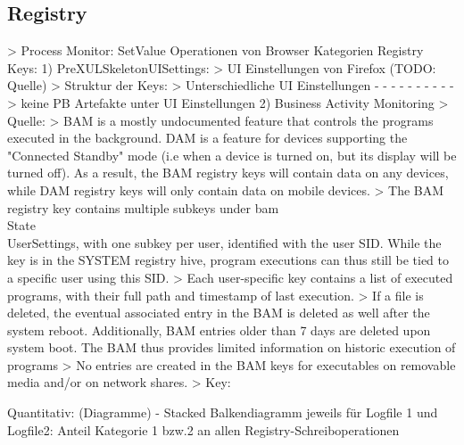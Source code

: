 \subsection*{Registry}
> Process Monitor: SetValue Operationen von Browser 
	Kategorien Registry Keys:
	1) PreXULSkeletonUISettings:
		> UI Einstellungen von Firefox (TODO: Quelle) 
		> Struktur der Keys: %
		> Unterschiedliche UI Einstellungen
			- %
			- %
			- %
			- %
			- %
			- %
			- %
			- %
			- %
			- %
		> keine PB Artefakte unter UI Einstellungen	
	2) Business Activity Monitoring %
		> Quelle: %
		> BAM is a mostly undocumented feature that controls the programs executed in the background. DAM is a feature for devices supporting the "Connected Standby" mode (i.e when a device is turned on, but its display will be turned off). As a result, the BAM registry keys will contain data on any devices, while DAM registry keys will only contain data on mobile devices.
		> The BAM registry key contains multiple subkeys under bam\\State\\UserSettings, with one subkey per user, identified with the user SID. While the key is in the SYSTEM registry hive, program executions can thus still be tied to a specific user using this SID.
		> Each user-specific key contains a list of executed programs, with their full path and timestamp of last execution.
		> If a file is deleted, the eventual associated entry in the BAM is deleted as well after the system reboot. Additionally, BAM entries older than 7 days are deleted upon system boot. The BAM thus provides limited information on historic execution of programs
		> No entries are created in the BAM keys for executables on removable media and/or on network shares.
		> Key: %

Quantitativ: (Diagramme)
	- Stacked Balkendiagramm jeweils für Logfile 1 und Logfile2: Anteil Kategorie 1 bzw.2 an allen Registry-Schreiboperationen

